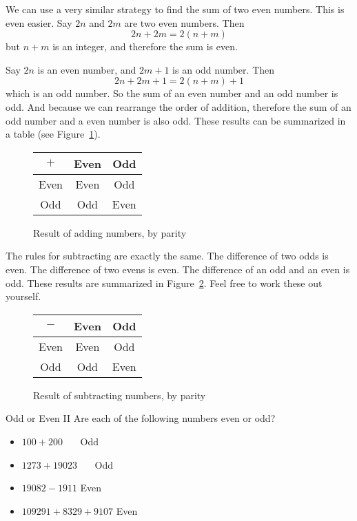 \documentclass[a4paper,10pt]{report}
\begin{document}
We can use a very similar strategy to find the sum of two even numbers. This is
even easier. Say \(2n\) and \(2m\) are two even numbers. Then \[
 2n + 2m = 2(n+m)
\] but \(n+m\) is an integer, and therefore the sum is even.

Say \(2n\) is an even number, and \(2m+1\) is an odd number. Then \[
 2n + 2m + 1 = 2(n+m) + 1
\] which is an odd number. So the sum of an even number and an odd number is
odd. And because we can rearrange the order of addition, therefore the sum of an
odd number and a even number is also odd. These results can be summarized in a
table (see Figure~\ref{pd:psumt}).

\begin{figure}
 \begin{tabular}{c|cc}
  \(+\) & Even & Odd  \\
  \hline
  Even   & Even & Odd \\
  Odd    & Odd & Even
 \end{tabular}

 \caption{Result of adding numbers, by parity}
 \label{pd:psumt}
\end{figure}

The rules for subtracting are exactly the same. The difference of two odds is
even. The difference of two evens is even. The difference of an odd and an even
is odd. These results are summarized in Figure~\ref{pd:pdifft}. Feel free to
work these out yourself.

\begin{figure}
 \begin{tabular}{c|cc}
  \(-\) & Even & Odd  \\
  \hline
  Even   & Even & Odd \\
  Odd    & Odd & Even
 \end{tabular}

 \caption{Result of subtracting numbers, by parity}
 \label{pd:pdifft}
\end{figure}

\begin{problem}{Odd or Even II}
 Are each of the following numbers even or odd?

 \begin{itemize}
  \item \(100 + 200\) \hfill {}~~~Odd
  \item \(1273 + 19023\) \hfill {}~~~Odd
  \item \(19082 - 1911\) \hfill Even~~~
  \item \(109291 + 8329 + 9107\) \hfill Even~~~
 \end{itemize}
\end{problem}
\end{document}
